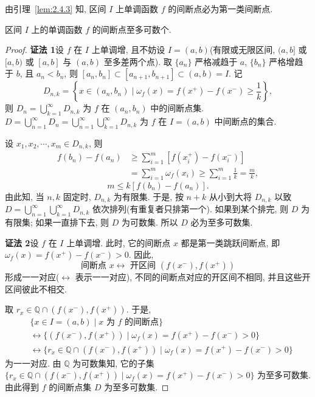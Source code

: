 由引理~\ref{lem:2.4.3} 知, 区间 $I$ 上单调函数 $f$ 的间断点必为第一类间断点.

\begin{theorem}\label{thm:2.4.7}
区间 $I$ 上的单调函数 $f$ 的间断点至多可数个.
\end{theorem}

\begin{proof}
\textbf{证法 1}\quad 设 $f$ 在 $I$ 上单调增, 且不妨设 $I = (a, b)$(有限或无限区间, $(a, b]$ 或 $[a, b)$ 或 $[a, b]$ 与 $(a, b)$ 至多差两个点). 取 $\{a_n\}$ 严格减趋于 $a$, $\{b_n\}$ 严格增趋于 $b$, 且 $a_n < b_n$, 则 $[a_n, b_n] \subset [a_{n+1}, b_{n+1}] \subset (a, b) = I$. 记
\[
D_{n,k} = \left\{x \in (a_n, b_n) \mid \omega_f(x) = f(x^+) - f(x^-) \geqslant \frac{1}{k}\right\},
\]
则 $D_n = \bigcup\limits_{k=1}^{\infty} D_{n,k}$ 为 $f$ 在 $(a_n, b_n)$ 中的间断点集. $D = \bigcup\limits_{n=1}^{\infty} D_n = \bigcup\limits_{n=1}^{\infty} \bigcup\limits_{k=1}^{\infty} D_{n,k}$ 为 $f$ 在 $I = (a, b)$ 中间断点的集合.

设 $x_1, x_2, \cdots, x_m \in D_{n,k}$, 则
\begin{align*}
f(b_n) - f(a_n) &\geqslant \sum_{i=1}^{m} \left[f(x_i^+) - f(x_i^-)\right] \\
&= \sum_{i=1}^{m} \omega_f(x_i) \geqslant \sum_{i=1}^{m} \frac{1}{k} = \frac{m}{k},
\end{align*}
\[
m \leqslant k [f(b_n) - f(a_n)].
\]
由此知, 当 $n, k$ 固定时, $D_{n,k}$ 为有限集. 于是, 按 $n + k$ 从小到大将 $D_{n,k}$ 以致 $D = \bigcup\limits_{n=1}^{\infty} \bigcup\limits_{k=1}^{\infty} D_{n,k}$ 依次排列(有重复者只排第一个). 如果到某个排完, 则 $D$ 为有限集; 如果一直排下去, 则 $D$ 为可数集. 所以 $D$ 必为至多可数集.

\textbf{证法 2}\quad 设 $f$ 在 $I$ 上单调增. 此时, 它的间断点 $x$ 都是第一类跳跃间断点, 即 $\omega_f(x) = f(x^+) - f(x^-) > 0$. 因此,
\[
\text{间断点 } x \longleftrightarrow \text{ 开区间 } (f(x^-), f(x^+))
\]
形成一一对应($\leftrightarrow$ 表示一一对应), 不同的间断点对应的开区间不相同, 并且这些开区间彼此不相交.

取 $r_x \in \mathbb{Q} \cap (f(x^-), f(x^+))$. 于是,
\begin{align*}
&\{x \in I = (a, b) \mid x \text{ 为 } f \text{ 的间断点}\} \\
&\longleftrightarrow \{(f(x^-), f(x^+)) \mid \omega_f(x) = f(x^+) - f(x^-) > 0\} \\
&\longleftrightarrow \{r_x \in \mathbb{Q} \cap (f(x^-), f(x^+)) \mid \omega_f(x) = f(x^+) - f(x^-) > 0\}
\end{align*}
为一一对应. 由 $\mathbb{Q}$ 为可数集知, 它的子集 $\{r_x \in \mathbb{Q} \cap (f(x^-), f(x^+)) \mid \omega_f(x) = f(x^+) - f(x^-) > 0\}$ 为至多可数集. 由此得到 $f$ 的间断点集 $D$ 为至多可数集.
\end{proof}

